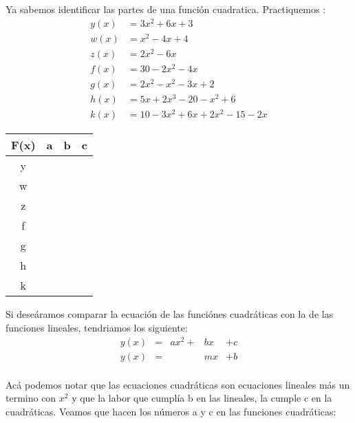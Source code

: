 \documentclass{article}
\begin{document}
Ya sabemos identificar las partes de una funci\'on cuadratica. Practiquemos : 
\begin{align}
y(x)&=3x^2+6x+3\\
w(x)&=x^2-4x+4\\
z(x)&=2x^2-6x\\
f(x)&=30-2x^2-4x\\
g(x)&=2x^2-x^2-3x+2\\
h(x)&=5x+2x^3-20-x^2+6\\
k(x)&=10-3x^2+6x+2x^2-15-2x
\end{align}
\begin{center}
\begin{tabular}{|c|p{2cm}|p{2cm}|p{2cm}|}
 \hline
F(x)&a&b&c\\
\hline
y&&&\\
w&&&\\
z&&&\\
f&&&\\
g&&&\\
h&&&\\
k&&&\\
\hline
\end{tabular}
\end{center}
Si dese\'aramos comparar la ecuaci\'on de las funci\'ones cuadr\'aticas con la de  las funciones lineales, tendriamos los siguiente: 
\[\begin{matrix}
y(x)&=&ax^{2}+&bx&+c\\
y(x)&=&&mx&+b\\
\end{matrix}\]


Ac\'a podemos notar que las ecuaciones cuadr\'aticas son ecuaciones lineales m\'as un termino con $x^{2}$ y que la labor que cumpl\'ia b en las lineales, la cumple c en la cuadr\'aticas. Veamos que hacen los n\'umeros a y c en las funciones cuadr\'aticas:\\
\end{document}
